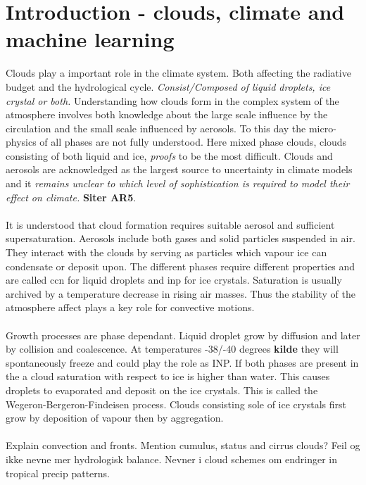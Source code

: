 \chapter{Introduction - clouds, climate and machine learning} \label{ch:introduction}

Clouds play a important role in the climate system. Both affecting the radiative budget and the hydrological cycle. \textit{Consist/Composed of liquid droplets, ice crystal or both.} Understanding how clouds form in the complex system of the atmosphere involves both knowledge about the large scale influence by the circulation and the small scale influenced by aerosols. To this day the micro-physics of all phases are not fully understood. Here mixed phase clouds, clouds consisting of both liquid and ice, \textit{proofs} to be the most difficult. Clouds and aerosols are acknowledged as the largest source to uncertainty in climate models and it \textit{remains unclear to which level of sophistication is required to model their effect on climate.} \textbf{Siter AR5}.
\\ \\
It is understood that cloud formation requires suitable aerosol and sufficient supersaturation. Aerosols include both gases and solid particles suspended in air.
They interact with the clouds by serving as particles which vapour ice can condensate or deposit upon. The different phases require different properties and are called \acrshort{ccn} for liquid droplets and \acrshort{inp} for ice crystals. Saturation is usually archived by a temperature decrease in rising air masses. Thus the stability of the atmosphere affect plays a key role for convective motions. 
\\ \\ 
Growth processes are phase dependant. Liquid droplet grow by diffusion and later by collision and coalescence. At temperatures -38/-40 degrees \textbf{kilde} they will spontaneously freeze and could play the role as INP. If both phases are present in the a cloud saturation with respect to ice is higher than water. This causes droplets to evaporated and deposit on the ice crystals. This is called the Wegeron-Bergeron-Findeisen process. Clouds consisting sole of ice crystals first grow by deposition of vapour then by aggregation. 
\\ \\ 
Explain convection and fronts. Mention cumulus, status and cirrus clouds?
Feil og ikke nevne mer hydrologisk balance. Nevner i cloud schemes om endringer in tropical precip patterns. 
\\ \\ 

